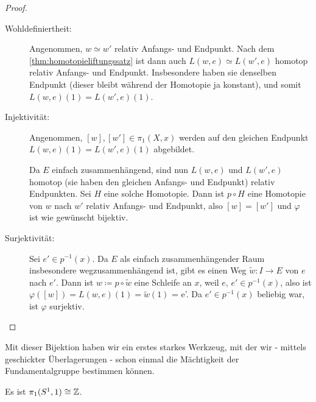 \begin{proof}
    \begin{description}
        \item[Wohldefiniertheit:] Angenommen, $w \simeq w'$ relativ Anfangs- und Endpunkt. Nach dem  \autoref{thm:homotopieliftungssatz} ist dann auch $L(w,e) \simeq L(w',e)$ homotop relativ Anfangs- und Endpunkt. Insbesondere haben sie denselben Endpunkt (dieser bleibt während der Homotopie ja konstant), und somit  $L(w,e)(1) = L(w',e)(1)$. 
        \item[Injektivität:] Angenommen, $[w], [w']\in \pi_1(X,x)$ werden auf den gleichen Endpunkt $L(w,e)(1) = L(w',e)(1)$ abgebildet. 

            Da $E$ einfach zusammenhängend, sind nun  $L(w,e)$ und  $L(w',e)$ homotop (sie haben den gleichen Anfangs- und Endpunkt) relativ Endpunkten. Sei $H$ eine solche Homotopie. Dann ist  $p \circ  H$ eine Homotopie von $w$ nach  $w'$ relativ Anfangs- und Endpunkt, also  $[w] = [w']$ und  $\varphi $ ist wie gewünscht bijektiv.
        \item[Surjektivität:] Sei $e' \in p^{-1} (x)$. Da $E$ als einfach zusammenhängender Raum insbesondere wegzusammenhängend ist, gibt es einen Weg  $\tilde{w}\colon I \to  E$ von $e$ nach  $e'$. Dann ist $w \coloneqq  p \circ  \tilde{w}$ eine Schleife an $x$, weil  $e$, $e' \in p^{-1} (x)$, also ist $\varphi ([w]) = L(w,e)(1) = \tilde{w}(1)$ = e'. Da $e'\in p^{-1} (x)$ beliebig war, ist $\varphi $ surjektiv.
    \end{description}
\end{proof}

\begin{oral}
    Mit dieser Bijektion haben wir ein erstes starkes Werkzeug, mit der wir - mittels geschickter Überlagerungen - schon einmal die Mächtigkeit der Fundamentalgruppe bestimmen können.
\end{oral}

\begin{theorem}\label{thm:fundamentalgruppe-von-s1-kreis}
    Es ist $\pi_1(S^1,1) \cong \mathbb{Z}$.
\end{theorem}


